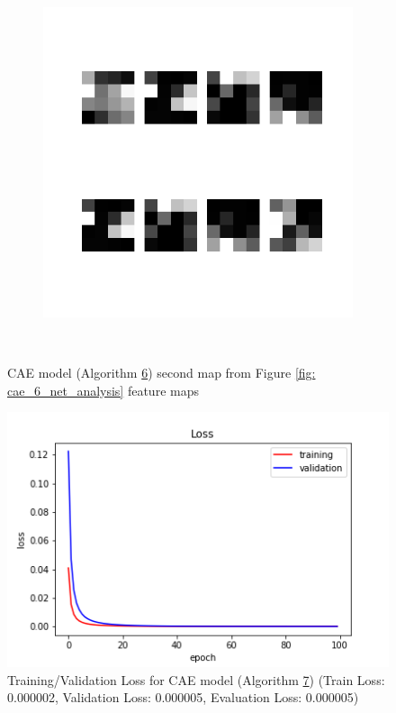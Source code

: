 \begin{figure}
\begin{subfigure}[b]{0.4\linewidth}
    \end{subfigure}
    \hfill
    \begin{subfigure}[b]{0.4\linewidth}
        \includegraphics[width=\linewidth]{images/cae_online_lstm/caelstm_section_cae_training_uniform_random_fill_10000_model_feature_maps_map_1_0_0.png}
    \end{subfigure}
    \\[-0.5cm]
    \caption{CAE model (Algorithm \hyperref[tab: app_evalalgorithms]{6}) second map from Figure \ref{fig: cae_6_net_analysis} feature maps}
    \label{fig: cae_6_feature_maps_2}
\end{figure}


\begin{figure}
    \centerfloat
    \includegraphics[scale=0.6]{images/cae_online_lstm/caelstm_section_cae_training_block_map_10000_model_loss.png}
    \caption{Training/Validation Loss for CAE model (Algorithm \hyperref[tab: app_evalalgorithms]{7}) (Train Loss: 0.000002, Validation Loss: 0.000005, Evaluation Loss: 0.000005)}
    \label{fig: cae_7_train}
\end{figure}

